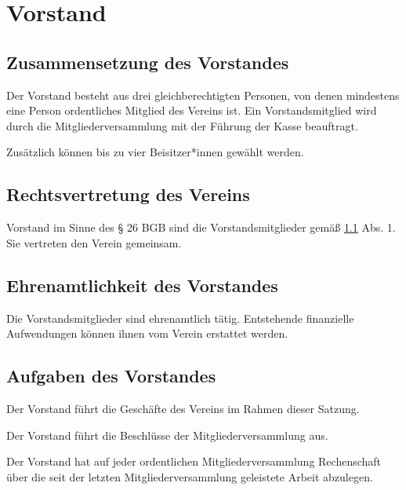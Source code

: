 \chapter{Vorstand}

\section{Zusammensetzung des Vorstandes}\label{cha:vorstand}
\begin{absätze}
    \item Der Vorstand besteht aus drei gleichberechtigten Personen, von denen mindestens eine Person ordentliches Mitglied des Vereins ist. Ein Vorstandsmitglied wird durch die Mitgliederversammlung mit der Führung der Kasse beauftragt.
    \item Zusätzlich können bis zu vier Beisitzer*innen gewählt werden.
\end{absätze}

\section{Rechtsvertretung des Vereins}
Vorstand im Sinne des § 26 BGB sind die Vorstandsmitglieder gemäß \ref{cha:vorstand} Abs. 1. Sie vertreten den Verein gemeinsam.

\section{Ehrenamtlichkeit des Vorstandes}
Die Vorstandsmitglieder sind ehrenamtlich tätig. Entstehende finanzielle Aufwendungen können ihnen vom Verein erstattet werden.
    
\section{Aufgaben des Vorstandes}
\begin{absätze}
    \item Der Vorstand führt die Geschäfte des Vereins im Rahmen dieser Satzung.
    \item Der Vorstand führt die Beschlüsse der Mitgliederversammlung aus.
    \item Der Vorstand hat auf jeder ordentlichen Mitgliederversammlung Rechenschaft über die seit der letzten Mitgliederversammlung geleistete Arbeit abzulegen.
\end{absätze}

